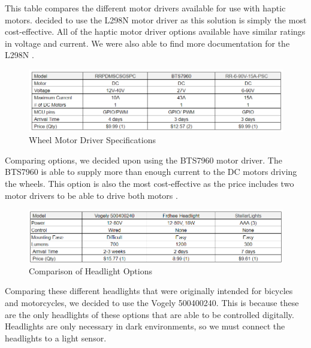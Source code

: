 \noindent This table compares the different motor drivers available for use with haptic motors.  decided to use the L298N motor driver as this solution is simply the most cost-effective. All of the haptic motor driver options available have similar ratings in voltage and current. We were also able to find more documentation for the L298N \cite{BOJACK} \cite{BEEYDC} \cite{HiLetgo}.\\

\begin{figure}[H]
	\centering
	\includegraphics[width=1\textwidth]{./Images/wheel_driver_table.png}
	\caption{\label{fig:wheel_driver}Wheel Motor Driver Specifications}
\end{figure}

\noindent Comparing options, we decided upon using the BTS7960 motor driver. The BTS7960 is able to supply more than enough current to the DC motors driving the wheels. This option is also the most cost-effective as the price includes two motor drivers to be able to drive both motors \cite{RioRand} \cite{Gikfun} \cite{Hobbywing}.\\

\begin{figure}[H]
	\centering
	\includegraphics[width=1\textwidth]{./Images/headlight_table.png}
	\caption{\label{fig:headlights}Comparison of Headlight Options}
\end{figure}

\noindent Comparing these different headlights that were originally intended for bicycles and motorcycles, we decided to use the Vogely ‎500400240. This is because these are the only headlights of these options that are able to be controlled digitally. Headlights are only necessary in dark environments, so we must connect the headlights to a light sensor. \cite{vogely2024} \cite{frdhee2024} \cite{stellarlights2024}\\

